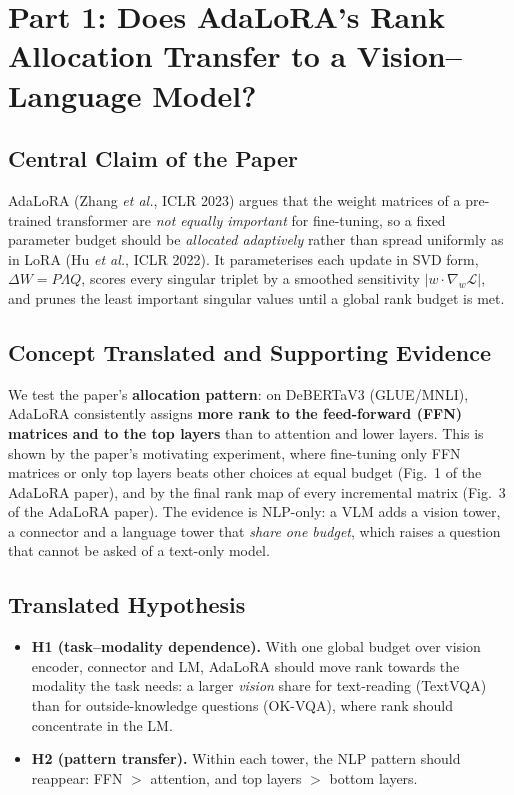 \documentclass[12pt,a4paper]{article}
\begin{document}
\section{Part 1: Does AdaLoRA's Rank Allocation Transfer to a Vision--Language Model?}
\small
\setlength{\parskip}{3pt}
\setlength{\parindent}{0pt}

\subsection{Central Claim of the Paper}
AdaLoRA (Zhang \emph{et al.}, ICLR 2023) argues that the weight matrices of a pre-trained transformer are \emph{not equally
important} for fine-tuning, so a fixed parameter budget should be \emph{allocated adaptively} rather than spread
uniformly as in LoRA (Hu \emph{et al.}, ICLR 2022). It parameterises each update in SVD form, $\Delta W = P\Lambda Q$, scores every
singular triplet by a smoothed sensitivity $|w\cdot\nabla_w\mathcal{L}|$, and prunes the least important
singular values until a global rank budget is met.

\subsection{Concept Translated and Supporting Evidence}
We test the paper's \textbf{allocation pattern}: on DeBERTaV3 (GLUE/MNLI), AdaLoRA consistently assigns
\textbf{more rank to the feed-forward (FFN) matrices and to the top layers} than to attention and lower layers.
This is shown by the paper's motivating experiment, where fine-tuning only FFN matrices or only top layers beats
other choices at equal budget (Fig.~1 of the AdaLoRA paper), and by the final rank map of every incremental matrix
(Fig.~3 of the AdaLoRA paper). %
The evidence is NLP-only: a VLM adds a vision tower, a connector and a language tower that \emph{share one
budget}, which raises a question that cannot be asked of a text-only model.

\subsection{Translated Hypothesis}
\begin{itemize}
    \item \textbf{H1 (task--modality dependence).} With one global budget over vision encoder, connector and LM,
    AdaLoRA should move rank towards the modality the task needs: a larger \emph{vision} share for text-reading
    (TextVQA) than for outside-knowledge questions (OK-VQA), where rank should concentrate in the LM.
    \item \textbf{H2 (pattern transfer).} Within each tower, the NLP pattern should reappear: FFN $>$ attention,
    and top layers $>$ bottom layers.
\end{itemize}
\end{document}

